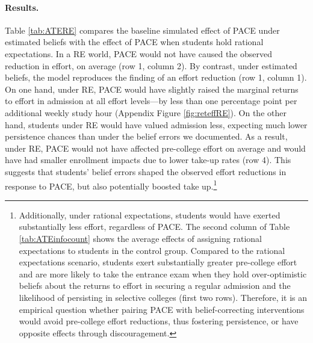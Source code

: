 \vspace{-1em}
\paragraph{Results.} Table \ref{tab:ATERE} compares the baseline simulated effect of PACE under estimated beliefs with the effect of PACE when students hold rational expectations. In a RE world, PACE would not have caused the observed reduction in effort, on average  (row 1, column 2). By contrast, under estimated beliefs, the model reproduces the finding of an effort reduction (row 1, column 1). On one hand, under RE, PACE would have slightly raised the marginal returns to effort in admission at all effort levels---by less than one percentage point per additional weekly study hour (Appendix Figure \ref{fig:reteffRE}). On the other hand, students under RE would have valued admission less, expecting much lower persistence chances than under the belief errors we documented. As a result, under RE, PACE would not have affected pre-college effort on average and would have had smaller enrollment impacts due to lower take-up rates (row 4). This suggests that students' belief errors shaped the observed effort reductions in response to PACE, but also potentially boosted take up.\footnote{Additionally, under rational expectations, students would have exerted substantially less effort, regardless of PACE.  The second column of Table \ref{tab:ATEinfocount} shows the average effects of assigning rational expectations to students in the control group. Compared to the rational expectations scenario, students exert substantially greater pre-college effort and are more likely to take the entrance exam when they hold over-optimistic beliefs about the returns to effort in securing a regular admission and the likelihood of persisting in selective colleges  (first two rows). Therefore, it is an empirical question whether pairing PACE with belief-correcting interventions would avoid pre-college effort reductions, thus fostering persistence, or have opposite effects through discouragement. }\par 




%










